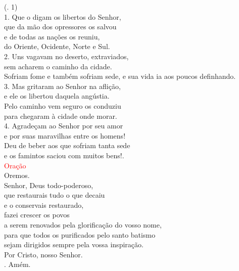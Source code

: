 \documentclass{book}
\begin{document}
\begin{flushleft}
    \hspace{\fill}
    {\color{red} (\Rbar. 1)}
    \vspace{.1cm} \\
    1. Que o digam os libertos do Senhor, \\
    que da mão dos opressores os salvou \\
    e de todas as nações os reuniu, \\
    do Oriente, Ocidente, Norte e Sul.
    \vspace{.1cm} \\
    2. Uns vagavam no deserto, extraviados, \\
    sem acharem o caminho da cidade. \\
    Sofriam fome e também sofriam sede,
    e sua vida ia aos poucos definhando.
    \vspace{.1cm} \\
    3. Mas gritaram ao Senhor na aflição, \\
    e ele os libertou daquela angústia. \\
    Pelo caminho vem seguro os conduziu \\
    para chegaram à cidade onde morar.
    \vspace{.1cm} \\
    4. Agradeçam ao Senhor por seu amor \\
    e por suas maravilhas entre os homens! \\
    Deu de beber aos que sofriam tanta sede \\
    e os famintos saciou com muitos bens!.
    \vspace{.2cm} \\
    \textcolor{red}{Oração}
    \vspace{.1cm} \\
    Oremos.
    \vspace{.1cm}\\
    Senhor, Deus todo-poderoso, \\
    que restaurais tudo o que decaiu \\
    e o conservais restaurado, \\
    fazei crescer os povos \\
    a serem renovados pela glorificação do vosso nome, \\
    para que todos os purificados pelo santo batismo \\
    sejam dirigidos sempre pela vossa inspiração. \\
    Por Cristo, nosso Senhor. \\
    {\color{red} \Rbar.} Amém.

\end{flushleft}
\end{document}
